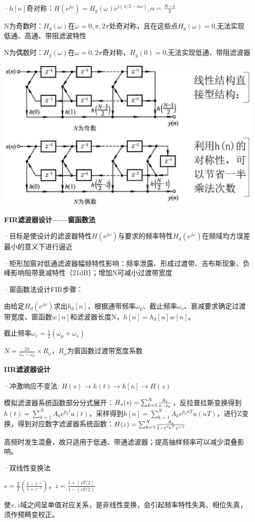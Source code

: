 ·$h[n]$奇对称：$H(e^{j\omega})=H_g(\omega)e^{j(\pi/2-\alpha\omega)}$,$\alpha={{N-1}\over{2}}$
   
   N为奇数时：$H_g(\omega)$在$\omega=0,\pi,2\pi$处奇对称，且在这些点$H_g(\omega)=0$,无法实现低通、高通、带阻滤波特性
   
   N为偶数时：$H_g(\omega)$在$\omega=0,2\pi$奇对称，$H_g(0)=0$,无法实现低通、带阻滤波器

\begin{figurehere}
	\centering
	\includegraphics[width=1\linewidth]{image03}
	\label{fig:image03}
\end{figurehere}
\textbf{FIR滤波器设计——窗函数法}

·目标是使设计的滤波器特性$H(e^{j\omega})$与要求的频率特性$H_d(e^{j\omega})$在频域均方误差最小的意义下进行逼近

·矩形加窗对低通滤波器幅频特性影响：频率泄露、形成过渡带、吉布斯现象、负峰影响阻带衰减特性（21dB）；增加N可减小过渡带宽度

·窗函数法设计FIR步骤：
   
   由给定$H_d(e^{j\omega})$求出$h_d[n]$，根据通带频率$\omega_p$、截止频率$\omega_s$、衰减要求确定过渡带宽度、窗函数$w[n]$和滤波器长度N，$h[n]=h_d[n]w[n]$。
   
   截止频率$\omega_c=\frac12(\omega_p+\omega_s)$
   
   $N=\frac{2\pi}{\omega_s-\omega_p}×R_\omega$，$R_\omega$为窗函数过渡带宽度系数

\textbf{IIR滤波器设计}

·冲激响应不变法: $H(s)\rightarrow h(t)\rightarrow h[n] \rightarrow H(z)$
   
   模拟滤波器系统函数部分分式展开：$H_a(s)={\sum_{k=1}^N}{{A_k}\over{s-s_k}}$，反拉普拉斯变换得到 $h(t)=\sum^{N}_{k=1}A_ke^{p_kt}u(t)$，采样得到$h[n]=\sum^{N}_{k=1}A_ke^{p_knT}u(nT)$，进行Z变换，得到对应数字滤波器系统函数：$H(z)={\sum_{k=1}^N}{{A_k}\over{1-e^{s_kT}z^{-1}}}$
   
   高频时发生混叠，故只适用于低通、带通滤波器；提高抽样频率可以减少混叠影响。

·双线性变换法
   
   $s=\frac{2}{T}(\frac{1-z^{-1}}{1+z^{-1}})$，$z=\frac{1+(sT/2)}{1-(sT/2)}$
   
   使$s,z$域之间呈单值对应关系，是非线性变换，会引起频率特性失真、相位失真，须作预畸变校正。